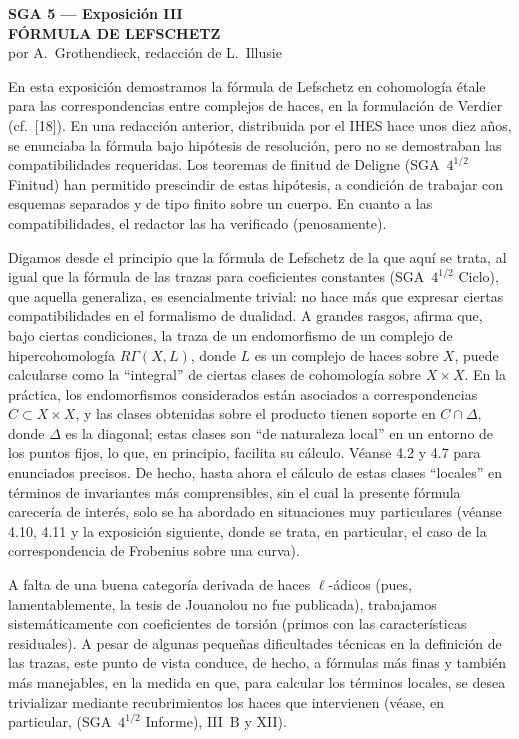 \clearpage
\begin{center}
{\Large \textbf{SGA 5 --- Exposición III}}\\[0.4em]
{\large \textbf{FÓRMULA DE LEFSCHETZ}}\\[0.3em]
por A.~Grothendieck, redacción de L.~Illusie
\end{center}
\enlargethispage{-2\baselineskip}

En esta exposición demostramos la fórmula de Lefschetz en cohomología étale para las correspondencias entre complejos de haces, en la formulación de Verdier (cf.~[18]). En una redacción anterior, distribuida por el IHES hace unos diez años, se enunciaba la fórmula bajo hipótesis de resolución, pero no se demostraban las compatibilidades requeridas. Los teoremas de finitud de Deligne (SGA~$4^{1/2}$ Finitud) han permitido prescindir de estas hipótesis, a condición de trabajar con esquemas separados y de tipo finito sobre un cuerpo. En cuanto a las compatibilidades, el redactor las ha verificado (penosamente).

Digamos desde el principio que la fórmula de Lefschetz de la que aquí se trata, al igual que la fórmula de las trazas para coeficientes constantes (SGA~$4^{1/2}$ Ciclo), que aquella generaliza, es esencialmente trivial: no hace más que expresar ciertas compatibilidades en el formalismo de dualidad. A grandes rasgos, afirma que, bajo ciertas condiciones, la traza de un endomorfismo de un complejo de hipercohomología $R\Gamma(X,L)$, donde $L$ es un complejo de haces sobre $X$, puede calcularse como la ``integral'' de ciertas clases de cohomología sobre $X \times X$. En la práctica, los endomorfismos considerados están asociados a correspondencias $C \subset X \times X$, y las clases obtenidas sobre el producto tienen soporte en $C \cap \Delta$, donde $\Delta$ es la diagonal; estas clases son ``de naturaleza local'' en un entorno de los puntos fijos, lo que, en principio, facilita su cálculo. Véanse 4.2 y 4.7 para enunciados precisos. De hecho, hasta ahora el cálculo de estas clases ``locales'' en términos de invariantes más comprensibles, sin el cual la presente fórmula carecería de interés, solo se ha abordado en situaciones muy particulares (véanse 4.10, 4.11 y la exposición siguiente, donde se trata, en particular, el caso de la correspondencia de Frobenius sobre una curva).

A falta de una buena categoría derivada de haces $\ell$-ádicos (pues, lamentablemente, la tesis de Jouanolou no fue publicada), trabajamos sistemáticamente con coeficientes de torsión (primos con las características residuales). A pesar de algunas pequeñas dificultades técnicas en la definición de las trazas, este punto de vista conduce, de hecho, a fórmulas más finas y también más manejables, en la medida en que, para calcular los términos locales, se desea trivializar mediante recubrimientos los haces que intervienen (véase, en particular, (SGA~$4^{1/2}$ Informe), III~B y XII).

